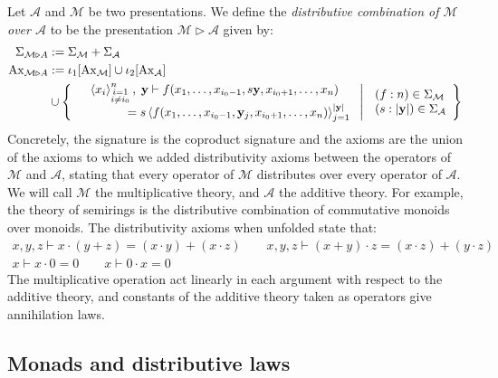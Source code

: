 Let $\mathcal{A}$ and $\mathcal{M}$ be two presentations. We define the \emph{distributive combination of $\mathcal{M}$ over $\mathcal{A}$} \parencite{discrete_lawvere_theories} to be the presentation $\mathcal M \triangleright \mathcal A$ given by: \begin{align*}
  \Sigma_{\mathcal M \triangleright A} &:= \Sigma_\mathcal{M} + \Sigma_\mathcal{A}\\
  \operatorname{Ax}_{\mathcal M \triangleright A} &:= \iota_1[\operatorname{Ax}_\mathcal{M}] \cup \iota_2[\operatorname{Ax}_{\mathcal A}]\\
  & \cup
    \left\{
    \left.
    \begin{array}{c}
    \left\langle x_i\right\rangle_{\substack{{i=1}\\{i\neq i_0}}}^{n},
    \;
    \mathbf{y} \vdash f(x_1,\ldots,x_{i_0-1},s \mathbf{y},x_{i_0+1},\ldots,x_n)
    \\[4pt]
    \qquad\qquad
    =
    s\left\langle
    f(x_1,\ldots,x_{i_0-1},\mathbf{y}_j,x_{i_0+1},\ldots,x_n)
    \right\rangle_{j=1}^{|\mathbf{y}|}
    \end{array}
    \;\right|\;
    \begin{array}{l}
    (f : n) \in \Sigma_\mathcal{M} \\
    (s : |\mathbf{y}|) \in \Sigma_\mathcal{A}
    \end{array}
    \right\}
\end{align*}
Concretely, the signature is the coproduct signature and the axioms are the union of the axioms to which we added distributivity axioms between the operators of $\mathcal{M}$ and $\mathcal{A}$, stating that every operator of $\mathcal{M}$ distributes over every operator of $\mathcal{A}$. We will call $\mathcal{M}$ the multiplicative theory, and $\mathcal{A}$ the additive theory. For example, the theory of semirings is the distributive combination of commutative monoids over monoids. The distributivity axioms when unfolded state that:
\begin{gather*}
  x, y, z \vdash x \cdot (y + z) = (x \cdot y) + (x \cdot z) \qquad x, y, z \vdash (x + y) \cdot z = (x \cdot z) + (y \cdot z)\\
  x \vdash x \cdot 0 = 0 \qquad x \vdash 0 \cdot x = 0
\end{gather*}
The multiplicative operation act linearly in each argument with respect to the additive theory, and constants of the additive theory taken as operators give annihilation laws.
\subsection{Monads and distributive laws}

